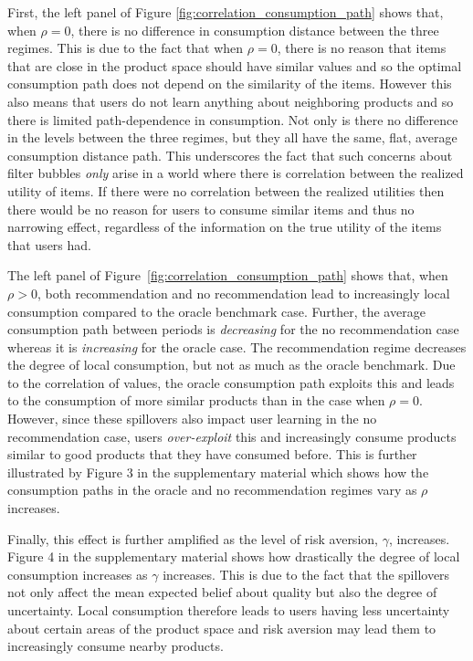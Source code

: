 \documentclass[format=acmsmall, review=false]{acmart}
\begin{document}
First, the left panel of Figure \ref{fig:correlation_consumption_path} shows that, when $\rho = 0$, there is no difference in consumption distance between the three regimes. This is due to the fact that when $\rho = 0$, there is no reason that items that are close in the product space should have similar values and so the optimal consumption path does not depend on the similarity of the items. However this also means that users do not learn anything about neighboring products and so there is limited path-dependence in consumption. Not only is there no difference in the levels between the three regimes, but they all have the same, flat, average consumption distance path. This underscores the fact that such concerns about filter bubbles \textit{only} arise in a world where there is correlation between the realized utility of items. If there were no correlation between the realized utilities then there would be no reason for users to consume similar items and thus no narrowing effect, regardless of the information on the true utility of the items that users had.
\par
The left panel of Figure~\ref{fig:correlation_consumption_path} shows that, when $\rho > 0$, both recommendation and no recommendation lead to increasingly local consumption compared to the oracle benchmark case. Further, the average consumption path between periods is \textit{decreasing} for the no recommendation case whereas it is \textit{increasing} for the oracle case. The recommendation regime decreases the degree of local consumption, but not as much as the oracle benchmark. Due to the correlation of values, the oracle consumption path exploits this and leads to the consumption of more similar products than in the case when $\rho = 0$. However, since these spillovers also impact user learning in the no recommendation case, users \textit{over-exploit} this and increasingly consume products similar to good products that they have consumed before. This is further illustrated by Figure 3 in the supplementary material  which shows how the consumption paths in the oracle and no recommendation regimes vary as $\rho$ increases.
\par

Finally, this effect is further amplified as the level of risk aversion, $\gamma$, increases. Figure 4 in the supplementary material shows how drastically the degree of local consumption increases as $\gamma$ increases. This is due to the fact that the spillovers not only affect the mean expected belief about quality but also the degree of uncertainty. Local consumption therefore leads to users having less uncertainty about certain areas of the product space and risk aversion may lead them to increasingly consume nearby products.
\end{document}
